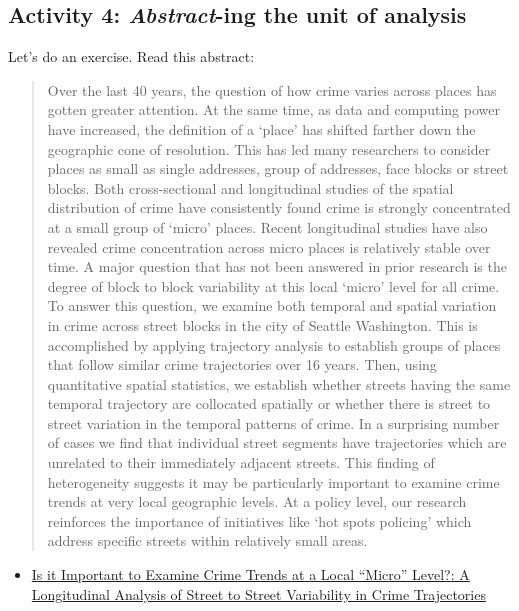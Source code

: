 \documentclass[]{book}
\providecommand{\tightlist}{%
  \setlength{\itemsep}{0pt}\setlength{\parskip}{0pt}}
\theoremstyle{definition}
\theoremstyle{definition}
\theoremstyle{definition}
\theoremstyle{remark}
\begin{document}
\hypertarget{activity-4-abstract-ing-the-unit-of-analysis}{%
\subsection{\texorpdfstring{Activity 4: \emph{Abstract}-ing the unit of
analysis}{Activity 4: Abstract-ing the unit of analysis}}\label{activity-4-abstract-ing-the-unit-of-analysis}}

 Let's do an exercise. Read this abstract:

\begin{quote}
Over the last 40 years, the question of how crime varies across places
has gotten greater attention. At the same time, as data and computing
power have increased, the definition of a `place' has shifted farther
down the geographic cone of resolution. This has led many researchers to
consider places as small as single addresses, group of addresses, face
blocks or street blocks. Both cross-sectional and longitudinal studies
of the spatial distribution of crime have consistently found crime is
strongly concentrated at a small group of `micro' places. Recent
longitudinal studies have also revealed crime concentration across micro
places is relatively stable over time. A major question that has not
been answered in prior research is the degree of block to block
variability at this local `micro' level for all crime. To answer this
question, we examine both temporal and spatial variation in crime across
street blocks in the city of Seattle Washington. This is accomplished by
applying trajectory analysis to establish groups of places that follow
similar crime trajectories over 16 years. Then, using quantitative
spatial statistics, we establish whether streets having the same
temporal trajectory are collocated spatially or whether there is street
to street variation in the temporal patterns of crime. In a surprising
number of cases we find that individual street segments have
trajectories which are unrelated to their immediately adjacent streets.
This finding of heterogeneity suggests it may be particularly important
to examine crime trends at very local geographic levels. At a policy
level, our research reinforces the importance of initiatives like `hot
spots policing' which address specific streets within relatively small
areas.
\end{quote}

\begin{itemize}
\tightlist
\item
  \href{https://link.springer.com/article/10.1007/s10940-009-9081-y}{Is
  it Important to Examine Crime Trends at a Local ``Micro'' Level?: A
  Longitudinal Analysis of Street to Street Variability in Crime
  Trajectories}
\end{itemize}
\end{document}
